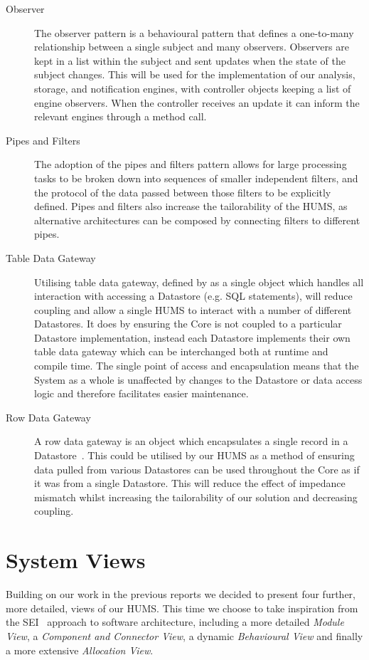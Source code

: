 \documentclass[10pt,a4paper]{article}
\begin{document}
\begin{description}
\item[Observer] The observer pattern is a behavioural pattern that defines a one-to-many relationship between a single subject and many observers. Observers are kept in a list within the subject and sent updates when the state of the subject changes. This will be used for the implementation of our analysis, storage, and notification engines, with controller objects keeping a list of engine observers. When the controller receives an update it can inform the relevant engines through a method call.
\item[Pipes and Filters] The adoption of the pipes and filters pattern allows for large processing tasks to be broken down into sequences of smaller independent filters, and the protocol of the data passed between those filters to be explicitly defined. Pipes and filters also increase the tailorability of the HUMS, as alternative architectures can be composed by connecting filters to different pipes.
\item[Table Data Gateway] Utilising table data gateway, defined by \cite{fowler2002patterns} as a single object which handles all interaction with accessing a Datastore (e.g. SQL statements), will reduce coupling and allow a single HUMS to interact with a number of different Datastores. It does by ensuring the Core is not coupled to a particular Datastore implementation, instead each Datastore implements their own table data gateway which can be interchanged both at runtime and compile time. The single point of access and encapsulation means that the System as a whole is unaffected by changes to the Datastore or data access logic and therefore facilitates easier maintenance.
\item[Row Data Gateway] A row data gateway is an object which encapsulates a single record in a Datastore~\cite{fowler2002patterns}. This could be utilised by our HUMS as a method of ensuring data pulled from various Datastores can be used throughout the Core as if it was from a single Datastore. This will reduce the effect of impedance mismatch whilst increasing the tailorability of our solution and decreasing coupling.
\end{description}

\section{System Views} 
Building on our work in the previous reports we decided to present four further, more detailed, views of our HUMS. This time we choose to take inspiration from the SEI~\cite{Bass98} approach to software architecture, including a more detailed \emph{Module View}, a \emph{Component and Connector View}, a dynamic \emph{Behavioural View} and finally a more extensive \emph{Allocation View}.
\end{document}
